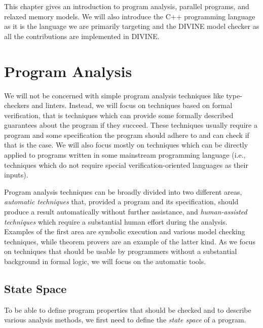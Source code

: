 This chapter gives an introduction to program analysis, parallel programs, and relaxed memory models.
We will also introduce the C++ programming language as it is the language we are primarily targeting and the DIVINE model checker as all the contributions are implemented in DIVINE.

\section{Program Analysis} %

We will not be concerned with simple program analysis techniques like type-checkers and linters.
Instead, we will focus on techniques based on formal verification, that is techniques which can provide some formally described guarantees about the program if they succeed.
These techniques usually require a program and some specification the program should adhere to and can check if that is the case.
We will also focus mostly on techniques which can be directly applied to programs written in some mainstream programming language (i.e., techniques which do not require special verification-oriented languages as their inputs).

Program analysis techniques can be broadly divided into two different areas, \emph{automatic techniques} that, provided a program and its specification, should produce a result automatically without further assistance, and \emph{human-assisted techniques} which require a substantial human effort during the analysis.
Examples of the first area are symbolic execution and various model checking techniques, while theorem provers are an example of the latter kind.
As we focus on techniques that should be usable by programmers without a substantial background in formal logic, we will focus on the automatic tools.


\subsection{State Space}

To be able to define program properties that should be checked and to describe various analysis methods, we first need to define the \emph{state space} of a program.


